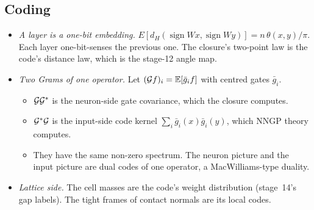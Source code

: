 \subsection{Coding}
\begin{itemize}[leftmargin=*]
\item \emph{A layer is a one-bit embedding.} $E[d_H(\operatorname{sign}Wx,\operatorname{sign}Wy)]=n\,\theta(x,y)/\pi$. Each layer one-bit-senses the
previous one. The closure's two-point law is the code's distance law, which is the stage-12 angle map.
\item \emph{Two Grams of one operator.} Let $(\mathcal G f)_i=\mathbb E[\bar g_i f]$ with centred gates $\bar g_i$.
\begin{itemize}
\item $\mathcal G\mathcal G^*$ is the neuron-side gate covariance, which the closure computes.
\item $\mathcal G^*\mathcal G$ is the input-side code kernel $\sum_i\bar g_i(x)\bar g_i(y)$, which NNGP theory computes.
\item They have the same non-zero spectrum. The neuron picture and the input picture are dual codes of one operator, a
MacWilliams-type duality.
\end{itemize}
\item \emph{Lattice side.} The cell masses are the code's weight distribution (stage~14's gap labels). The tight frames of contact
normals are its local codes.
\end{itemize}
